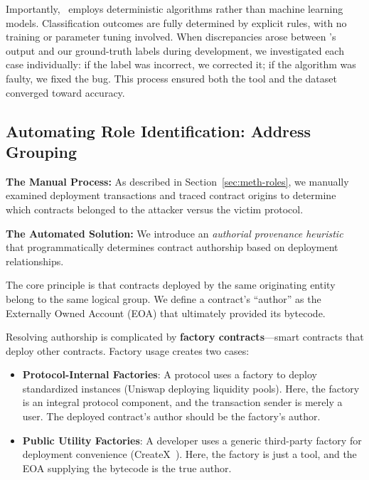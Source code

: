 Importantly, \ToolName\ employs deterministic algorithms rather than machine learning models. Classification outcomes are fully determined by explicit rules, with no training or parameter tuning involved. When discrepancies arose between \ToolName's output and our ground-truth labels during development, we investigated each case individually: if the label was incorrect, we corrected it; if the algorithm was faulty, we fixed the bug. This process ensured both the tool and the dataset converged toward accuracy.

\subsection{Automating Role Identification: Address Grouping}
\label{sec:meth-grouping}

\textbf{The Manual Process:} As described in Section~\ref{sec:meth-roles}, we manually examined deployment transactions and traced contract origins to determine which contracts belonged to the attacker versus the victim protocol.

\textbf{The Automated Solution:} We introduce an \textit{authorial provenance heuristic} that programmatically determines contract authorship based on deployment relationships.

The core principle is that contracts deployed by the same originating entity belong to the same logical group. We define a contract's ``author'' as the Externally Owned Account (EOA) that ultimately provided its bytecode.

Resolving authorship is complicated by \textbf{factory contracts}---smart contracts that deploy other contracts. Factory usage creates two cases:

\begin{itemize}
    \item \textbf{Protocol-Internal Factories}: A protocol uses a factory to deploy standardized instances (\eg Uniswap deploying liquidity pools). Here, the factory is an integral protocol component, and the transaction sender is merely a user. The deployed contract's author should be the factory's author.
    
    \item \textbf{Public Utility Factories}: A developer uses a generic third-party factory for deployment convenience (\eg CreateX~\cite{createx}). Here, the factory is just a tool, and the EOA supplying the bytecode is the true author.
\end{itemize}

